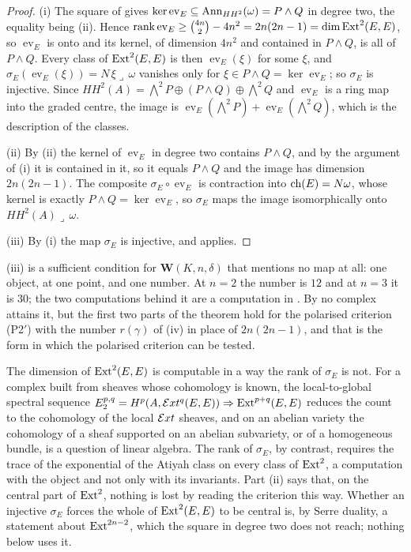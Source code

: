 \begin{proof}
(i) The square of  gives $\ker\operatorname{ev}_{E}
\subseteq\operatorname{Ann}_{HH^{2}}(\omega)=P\wedge Q$ in degree two, the equality being
(ii). Hence $\operatorname{rank}\operatorname{ev}_{E}
\ge\binom{4n}{2}-4n^{2}=2n(2n-1)=\dim\operatorname{Ext}^{2}(E,E)$, so
$\operatorname{ev}_{E}$ is onto and its kernel, of dimension $4n^{2}$ and
contained in $P\wedge Q$, is all of $P\wedge Q$. Every class of
$\operatorname{Ext}^{2}(E,E)$ is then $\operatorname{ev}_{E}(\xi)$ for some $\xi$, and
$\sigma_{E}(\operatorname{ev}_{E}(\xi))=N\,\xi\lrcorner\,\omega$ vanishes only
for $\xi\in P\wedge Q=\ker\operatorname{ev}_{E}$; so $\sigma_{E}$ is injective.
Since $HH^{2}(A)=\bigwedge^{2}P\oplus(P\wedge Q)\oplus\bigwedge^{2}Q$ and
$\operatorname{ev}_{E}$ is a ring map into the graded centre, the image is
$\operatorname{ev}_{E}(\bigwedge^{2}P)+\operatorname{ev}_{E}(\bigwedge^{2}Q)$,
which is the description of the classes.

(ii) By (ii) the kernel of $\operatorname{ev}_{E}$ in
degree two contains $P\wedge Q$, and by the argument of (i) it is contained in
it, so it equals $P\wedge Q$ and the image has dimension $2n(2n-1)$. The
composite $\sigma_{E}\circ\operatorname{ev}_{E}$ is contraction into
$\operatorname{ch}(E)=N\omega$, whose kernel is exactly $P\wedge Q=\ker\operatorname{ev}_{E}$,
so $\sigma_{E}$ maps the image isomorphically onto
$HH^{2}(A)\lrcorner\,\omega$.

(iii) By (i) the map $\sigma_{E}$ is injective, and 
applies.
\end{proof}

(iii) is a sufficient condition for
$\mathbf{W}(K,n,\delta)$ that mentions no map at all: one object, at one
point, and one number. At $n=2$ the number is $12$ and at $n=3$ it is $30$;
the two computations behind it are a computation in \cite{BMB26}.
By  no complex attains it, but the first two parts of the
theorem hold for the polarised criterion (P2$'$) with the number $r(\gamma)$
of (iv) in place of $2n(2n-1)$, and that is the form
in which the polarised criterion can be tested.

The dimension of $\operatorname{Ext}^{2}(E,E)$ is computable in a way the rank of
$\sigma_{E}$ is not. For a complex built from sheaves whose cohomology is
known, the local-to-global spectral sequence
$E_{2}^{p,q}=H^{p}(A,\mathcal{E} xt^{q}(E,E))\Rightarrow\operatorname{Ext}^{p+q}(E,E)$ reduces the
count to the cohomology of the local $\mathcal{E} xt$ sheaves, and on an abelian
variety the cohomology of a sheaf supported on an abelian subvariety, or of a
homogeneous bundle, is a question of linear algebra. The rank of
$\sigma_{E}$, by contrast, requires the trace of the exponential of the
Atiyah class on every class of $\operatorname{Ext}^{2}$, a computation with the object and
not only with its invariants. Part (ii) says that, on the central part of
$\operatorname{Ext}^{2}$, nothing is lost by reading the criterion this way. Whether an
injective $\sigma_{E}$ forces the whole of $\operatorname{Ext}^{2}(E,E)$ to be central is,
by Serre duality, a statement about $\operatorname{Ext}^{2n-2}$, which the square in degree
two does not reach; nothing below uses it.

